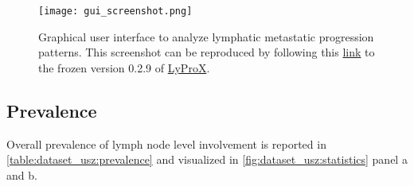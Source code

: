 \documentclass[\relativeRoot/main.tex]{subfiles}
\begin{document}
\begin{figure}
    \centering
    \texttt{[image: gui\_screenshot.png]}
    \caption[Screenshot of the graphical user interface LyProX]{Graphical user interface to analyze lymphatic metastatic progression patterns. This screenshot can be reproduced by following this \href{https://2021-oropharynx.lyprox.org/dashboard/?nicotine_abuse=0&hpv_status=0&neck_dissection=-1&n_status=0&central=0&extension=1&subsite__in=base&subsite__in=tonsil&subsite__in=rest&t_stage__in=3&t_stage__in=4&institution__in=1&modalities=0&modalities=1&modalities=2&modalities=3&modality_combine=OR&contra_I=0&contra_Ia=0&contra_Ib=0&contra_II=0&contra_IIa=0&contra_IIb=0&contra_III=0&contra_IV=0&contra_V=0&contra_VII=0&ipsi_I=0&ipsi_Ia=0&ipsi_Ib=0&ipsi_II=1&ipsi_IIa=0&ipsi_IIb=0&ipsi_III=0&ipsi_IV=0&ipsi_V=0&ipsi_VII=0&show_percent=False&render=dashboard}{ link} to the frozen version 0.2.9 of \href{https://lyprox.org}{ LyProX}.}
    \label{fig:dataset_usz:gui_screenshot}
\end{figure}

\subsection*{Prevalence}

Overall prevalence of lymph node level involvement is reported in \cref{table:dataset_usz:prevalence} and visualized in \cref{fig:dataset_usz:statistics} panel a and b.
\end{document}
